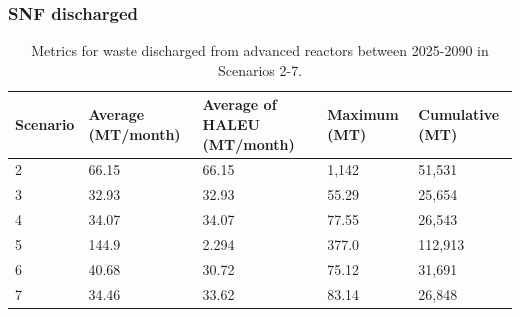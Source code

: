 \begin{frame}
    \frametitle{SNF discharged}
    \begin{table}
        \centering 
        \caption{Metrics for waste discharged from advanced reactors 
        between 2025-2090 in Scenarios 2-7.}
        \label{tab:nogrowth_waste}
        \begin{tabular}{l p{2cm} p{2cm} p{2cm} p{2cm}}
            \hline
            Scenario & Average (MT/month) & Average of \gls{HALEU} 
            (MT/month) & Maximum (MT) & Cumulative (MT)\\\hline
            2 & 66.15 & 66.15 & 1,142 & 51,531\\
            3 & 32.93 & 32.93 & 55.29 & 25,654\\
            4 & 34.07 & 34.07 & 77.55 & 26,543\\
            5 & 144.9 & 2.294 & 377.0 & 112,913\\
            6 & 40.68 & 30.72 & 75.12 & 31,691\\
            7 & 34.46 & 33.62 & 83.14 & 26,848\\
            \hline
        \end{tabular}
    \end{table}

\end{frame}